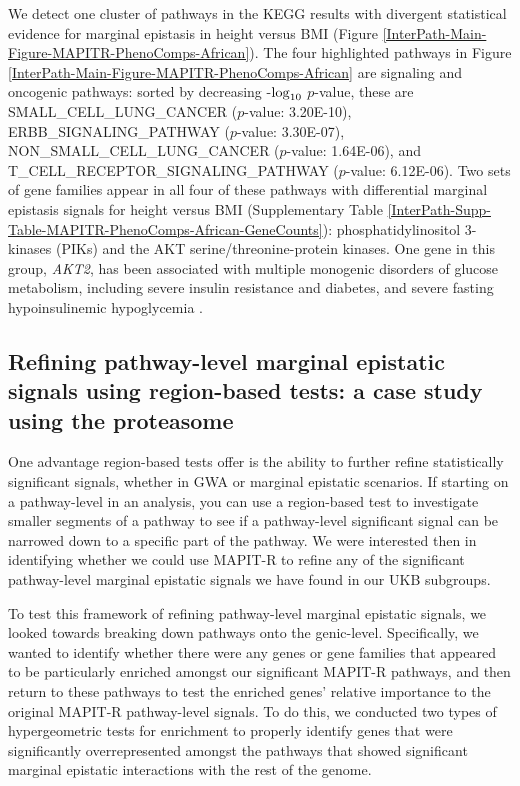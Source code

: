 \documentclass[12pt,a4paper]{article}
\def\log{{\rm log}}
\newcommand{\T}{\intercal}
\begin{document}
We detect one cluster of pathways in the KEGG results  with divergent statistical evidence for marginal epistasis in height versus BMI (Figure \ref{InterPath-Main-Figure-MAPITR-PhenoComps-African}). The four highlighted pathways in Figure \ref{InterPath-Main-Figure-MAPITR-PhenoComps-African} are signaling and oncogenic pathways: sorted by decreasing -$\log_{10}$ $p$-value, these are SMALL\_CELL\_LUNG\_CANCER ($p$-value: 3.20E-10), ERBB\_SIGNALING\_PATHWAY ($p$-value: 3.30E-07), \\NON\_SMALL\_CELL\_LUNG\_CANCER ($p$-value: 1.64E-06), and \\T\_CELL\_RECEPTOR\_SIGNALING\_PATHWAY ($p$-value: 6.12E-06). Two sets of gene families appear in all four of these pathways with differential marginal epistasis signals for height versus BMI (Supplementary Table \ref{InterPath-Supp-Table-MAPITR-PhenoComps-African-GeneCounts}): phosphatidylinositol 3-kinases (PIKs) and the AKT serine/threonine-protein kinases. One gene in this group, \emph{AKT2}, has been associated with multiple monogenic disorders of glucose metabolism, including severe insulin resistance and diabetes, and severe fasting hypoinsulinemic hypoglycemia \citep{George2004,Manning2017,Latva-Rasku2018}.

\subsection{Refining pathway-level marginal epistatic signals using region-based tests: a case study using the proteasome}

One advantage region-based tests offer is the ability to further refine statistically significant signals, whether in GWA or marginal epistatic scenarios. If starting on a pathway-level in an analysis, you can use a region-based test to investigate smaller segments of a pathway to see if a pathway-level significant signal can be narrowed down to a specific part of the pathway. We were interested then in identifying whether we could use MAPIT-R to refine any of the significant pathway-level marginal epistatic signals we have found in our UKB subgroups.

To test this framework of refining pathway-level marginal epistatic signals, we looked towards breaking down pathways onto the genic-level. Specifically, we wanted to identify whether there were any genes or gene families that appeared to be particularly enriched amongst our significant MAPIT-R pathways, and then return to these pathways to test the enriched genes' relative importance to the original MAPIT-R pathway-level signals. To do this, we conducted two types of hypergeometric tests for enrichment to properly identify genes that were significantly overrepresented amongst the pathways that showed significant marginal epistatic interactions with the rest of the genome. 
\end{document}
